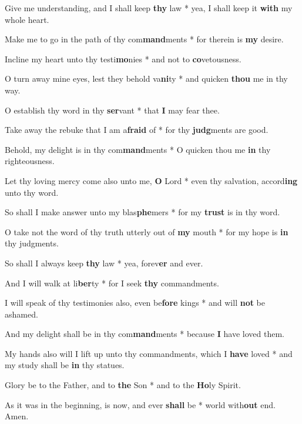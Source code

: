 \begin{multicols}{2}
	Give me understanding, and I shall keep \textbf{thy} law * yea, I shall keep it \textbf{with} my whole heart.
	
	Make me to go in the path of thy com\textbf{mand}ments * for therein is \textbf{my} desire.
	
	Incline my heart unto thy testi\textbf{mo}nies * and not to \textbf{co}vetousness.
	
	O turn away mine eyes, lest they behold va\textbf{ni}ty * and quicken \textbf{thou} me in thy way.
	
	O establish thy word in thy \textbf{ser}vant * that \textbf{I} may fear thee.
	
	Take away the rebuke that I am a\textbf{fraid} of * for thy \textbf{judg}ments are good.
	
	Behold, my delight is in thy com\textbf{mand}ments * O quicken thou me \textbf{in} thy righteousness.
	
	Let thy loving mercy come also unto me, \textbf{O} Lord * even thy salvation, accord\textbf{ing} unto thy word.
	
	So shall I make answer unto my blas\textbf{phe}mers * for my \textbf{trust} is in thy word.
	
	O take not the word of thy truth utterly out of \textbf{my} mouth * for my hope is \textbf{in} thy judgments.
	
	So shall I always keep \textbf{thy} law * yea, forev\textbf{er} and ever.
	
	And I will walk at li\textbf{ber}ty * for I seek \textbf{thy} commandments.
	
	I will speak of thy testimonies also, even be\textbf{fore} kings * and will \textbf{not} be ashamed.
	
	And my delight shall be in thy com\textbf{mand}ments * because \textbf{I} have loved them.
	
	My hands also will I lift up unto thy commandments, which I \textbf{have} loved * and my study shall be \textbf{in} thy statues.
	
	Glory be to the Father, and to \textbf{the} Son * and to the \textbf{Ho}ly Spirit.
	
	As it was in the beginning, is now, and ever \textbf{shall} be * world with\textbf{out} end. Amen.
\end{multicols}